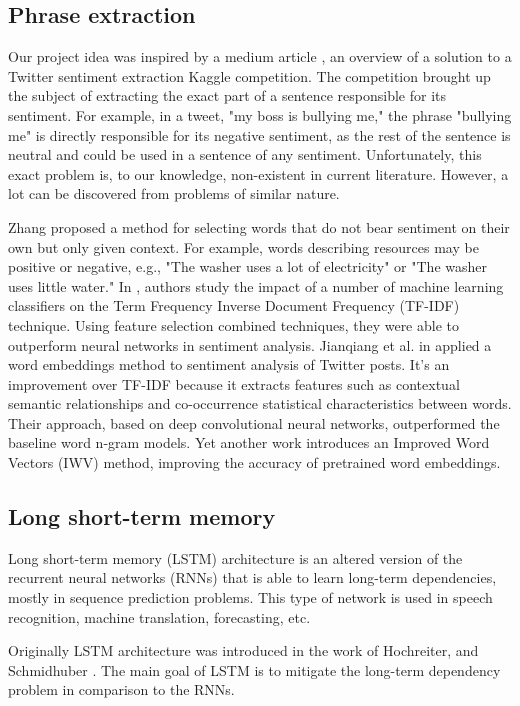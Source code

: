 \documentclass[11pt]{article}
\begin{document}
\subsection{Phrase extraction}
Our project idea was inspired by a medium article \cite{medium_extract}, an overview of a solution to a Twitter sentiment extraction Kaggle competition\cite{kaggle_comp}. The competition brought up the subject of extracting the exact part of a sentence responsible for its sentiment. For example, in a tweet, "my boss is bullying me," the phrase "bullying me" is directly responsible for its negative sentiment, as the rest of the sentence is neutral and could be used in a sentence of any sentiment. Unfortunately, this exact problem is, to our knowledge, non-existent in current literature. However, a lot can be discovered from problems of similar nature. 

Zhang  proposed a method for selecting words that do not bear sentiment on their own but only given context. For example, words describing resources may be positive or negative, e.g., "The washer uses a lot of electricity" or "The washer uses little water." In \cite{madasu2020efficient}, authors study the impact of a number of machine learning classifiers on the Term Frequency Inverse Document Frequency (TF-IDF) technique. Using feature selection combined techniques, they were able to outperform neural networks in sentiment analysis. Jianqiang et al. in  applied a word embeddings method to sentiment analysis of Twitter posts. It's an improvement over TF-IDF because it extracts features such as contextual semantic relationships and co-occurrence statistical characteristics between words. Their approach, based on deep convolutional neural networks, outperformed the baseline word n-gram models. Yet another work \cite{rezaeinia2017improving} introduces an Improved Word Vectors (IWV) method, improving the accuracy of pretrained word embeddings. 


\subsection{Long short-term memory}
Long short-term memory (LSTM) architecture is an altered version of the recurrent neural networks (RNNs) that is able to learn long-term dependencies, mostly in sequence prediction problems. This type of network is used in speech recognition, machine translation, forecasting, etc.

Originally LSTM architecture was introduced in the work of Hochreiter, and Schmidhuber . The main goal of LSTM is to mitigate the long-term dependency problem in comparison to the RNNs. 
\end{document}
